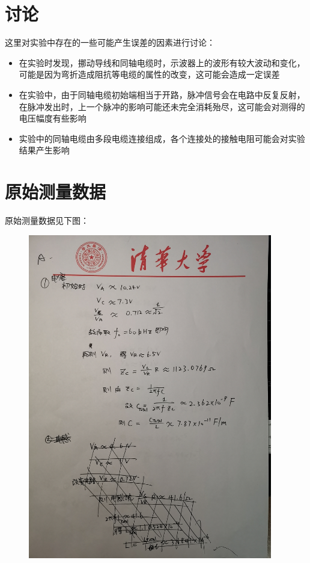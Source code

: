 \documentclass[UTF8]{ctexart}
\begin{document}
\section{讨论}
这里对实验中存在的一些可能产生误差的因素进行讨论：
\begin{itemize}
\item 在实验时发现，挪动导线和同轴电缆时，示波器上的波形有较大波动和变化，可能是因为弯折造成阻抗等电缆的属性的改变，这可能会造成一定误差
\item 在实验中，由于同轴电缆初始端相当于开路，脉冲信号会在电路中反复反射，在脉冲发出时，上一个脉冲的影响可能还未完全消耗殆尽，这可能会对测得的电压幅度有些影响
\item 实验中的同轴电缆由多段电缆连接组成，各个连接处的接触电阻可能会对实验结果产生影响
\end{itemize}
\section{原始测量数据}
原始测量数据见下图：
\begin{figure}[H]
\centering
\includegraphics[width=0.95\textwidth]{A1.jpg}
\end{figure}
\end{document}
